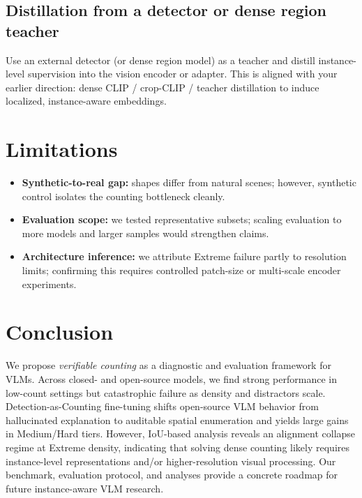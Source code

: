 \documentclass[10pt]{article}
\begin{document}
\subsection{Distillation from a detector or dense region teacher}
Use an external detector (or dense region model) as a teacher and distill instance-level supervision into the vision encoder or adapter.
This is aligned with your earlier direction: dense CLIP / crop-CLIP / teacher distillation to induce localized, instance-aware embeddings.

\section{Limitations}
\begin{itemize}[leftmargin=1.2em]
  \item \textbf{Synthetic-to-real gap:} shapes differ from natural scenes; however, synthetic control isolates the counting bottleneck cleanly.
  \item \textbf{Evaluation scope:} we tested representative subsets; scaling evaluation to more models and larger samples would strengthen claims.
  \item \textbf{Architecture inference:} we attribute Extreme failure partly to resolution limits; confirming this requires controlled patch-size or multi-scale encoder experiments.
\end{itemize}

\section{Conclusion}
We propose \emph{verifiable counting} as a diagnostic and evaluation framework for VLMs.
Across closed- and open-source models, we find strong performance in low-count settings but catastrophic failure as density and distractors scale.
Detection-as-Counting fine-tuning shifts open-source VLM behavior from hallucinated explanation to auditable spatial enumeration and yields large gains in Medium/Hard tiers.
However, IoU-based analysis reveals an alignment collapse regime at Extreme density, indicating that solving dense counting likely requires instance-level representations and/or higher-resolution visual processing.
Our benchmark, evaluation protocol, and analyses provide a concrete roadmap for future instance-aware VLM research.

% 
% 
\end{document}
